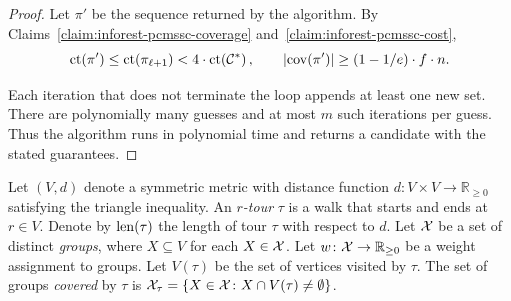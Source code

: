 \begin{proof}
Let $\pi'$ be the sequence returned by the algorithm. By Claims~\ref{claim:inforest-pcmssc-coverage} and~\ref{claim:inforest-pcmssc-cost},
\[
    \operatorname{ct}\mathopen{}\left( \pi' \right)
    \leq\operatorname{ct}\mathopen{}\left( \pi_{\ell+1} \right)<4\cdot\operatorname{ct}\mathopen{}\left( \mathcal{C}^{*} \right),\qquad
    \mathopen{}\left| \operatorname{cov}\mathopen{}\left( \pi' \right) \right|\geq(1-1/e)\cdot f\cdot n.
\]

Each iteration that does not terminate the loop appends at least one new set. There are polynomially many guesses and at most $m$ such iterations per guess. Thus the algorithm runs in polynomial time and returns a candidate with the stated guarantees.
\end{proof}

\medskip
{}
Let $(V,d)$ denote a symmetric metric with distance function $d\colon V \times V \to \mathbb{R}_{\geq 0}$ satisfying the triangle inequality.
An \emph{$r$-tour} $\tau$ is a walk that starts and ends at $r \in V$. Denote by $\operatorname{len}\mathopen{}\left( \tau \right)$ the length of tour $\tau$ with respect to $d$.
Let $\mathcal{X}$ be a set of distinct \emph{groups}, where $X\subseteq V$ for each $X \in \mathcal{X}$.
Let $w\colon \mathcal{X} \to \mathbb{R}_{\geq 0}$ be a weight assignment to groups.
Let $V(\tau)$ be the set of vertices visited by $\tau$. The set of groups \emph{covered} by $\tau$ is $\mathcal{X}_\tau=\mathopen{}\left\{ X\in\mathcal{X}\colon X\cap V(\tau)\neq\emptyset \right\}$.

